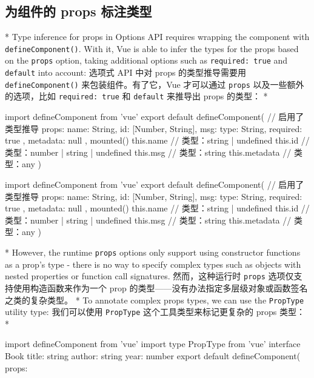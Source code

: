 \begin{paracol}{2}
\subsection{为组件的 props 标注类型}
\switchcolumn[0]*%
Type inference for props in Options API requires wrapping the component
with \texttt{defineComponent()}. With it, Vue is able to infer the types
for the props based on the \texttt{props} option, taking additional
options such as \texttt{required:\ true} and \texttt{default} into
account:
\switchcolumn
选项式 API 中对 props 的类型推导需要用 \texttt{defineComponent()}
来包装组件。有了它，Vue 才可以通过 \texttt{props}
以及一些额外的选项，比如 \texttt{required:\ true} 和 \texttt{default}
来推导出 props 的类型：
\switchcolumn[0]*%
\begin{codeTs}
import { defineComponent } from 'vue'
export default defineComponent({
  // 启用了类型推导
  props: {
    name: String,
    id: [Number, String],
    msg: { type: String, required: true },
    metadata: null
  },
  mounted() {
    this.name // 类型：string | undefined
    this.id // 类型：number | string | undefined
    this.msg // 类型：string
    this.metadata // 类型：any
  }
})
\end{codeTs}
\switchcolumn
\begin{codeTs}
import { defineComponent } from 'vue'
export default defineComponent({
    // 启用了类型推导
    props: {
    name: String,
    id: [Number, String],
    msg: { type: String, required: true },
    metadata: null
    },
    mounted() {
    this.name // 类型：string | undefined
    this.id // 类型：number | string | undefined
    this.msg // 类型：string
    this.metadata // 类型：any
    }
})
\end{codeTs}
\switchcolumn[0]*%
However, the runtime \texttt{props} options only support using
constructor functions as a prop's type - there is no way to specify
complex types such as objects with nested properties or function call
signatures.
\switchcolumn
然而，这种运行时 \texttt{props} 选项仅支持使用构造函数来作为一个 prop
的类型------没有办法指定多层级对象或函数签名之类的复杂类型。
\switchcolumn[0]*%
To annotate complex props types, we can use the \texttt{PropType}
utility type:
\switchcolumn
我们可以使用 \texttt{PropType} 这个工具类型来标记更复杂的 props 类型：
\switchcolumn[0]*%
\begin{codeTs}
import { defineComponent } from 'vue'
import type { PropType } from 'vue'
interface Book {
  title: string
  author: string
  year: number
}
export default defineComponent({
  props: {
}}
\end{codeTs}
\end{paracol}
